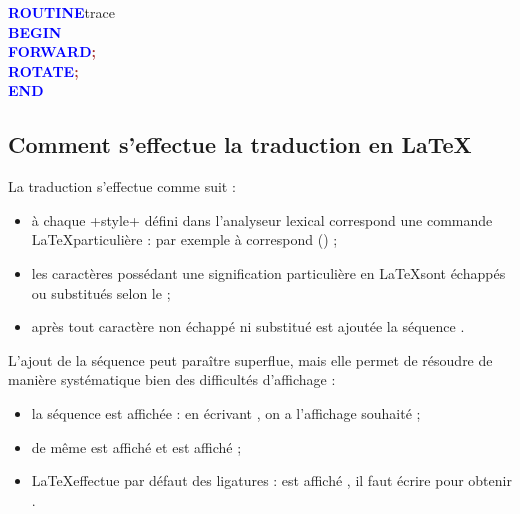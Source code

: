 {

\begin{siderulesRed}
\ttfamily
\textcolor{blue}{\bf ROUTINE}\hspace*{.6em}t{}r{}a{}c{}e{} \\
\textcolor{blue}{\bf BEGIN} \\
\hspace*{1.2em}\textcolor{blue}{\bf FORWARD}\hspace*{.6em}\textcolor{brown}{\bf ;} \\
\hspace*{1.2em}\textcolor{blue}{\bf ROTATE}\hspace*{.6em}\textcolor{brown}{\bf ;} \\
\textcolor{blue}{\bf END}
\end{siderulesRed}
}

\subsection{Comment s'effectue la traduction en \LaTeX}

La traduction s'effectue comme suit :
\begin{itemize}
  \item à chaque \ggs+style+ défini dans l'analyseur lexical correspond une commande \LaTeX particulière : par exemple à  correspond  () ;
  \item les caractères possédant une signification particulière en \LaTeX sont échappés ou substitués selon le  ;
  \item après tout caractère non échappé ni substitué est ajoutée la séquence \tpp{\{\}}.
\end{itemize}

L'ajout de la séquence \tpp{\{\}} peut paraître superflue, mais elle permet de résoudre de manière systématique bien des difficultés d'affichage :
\begin{itemize}
  \item la séquence \tpp{-{}-} est affichée \tpp{--} : en écrivant \tpp{-\{\}-\{\}}, on a l'affichage souhaité \tpp{-{}-} ;
  \item de même \tpp{\textgreater{}\textgreater} est affiché \tpp{\textgreater\textgreater} et \tpp{\textless{}\textless} est affiché \tpp{\textless\textless} ;
  \item \LaTeX effectue par défaut des ligatures :  est affiché , il faut écrire  pour obtenir  .
\end{itemize}



